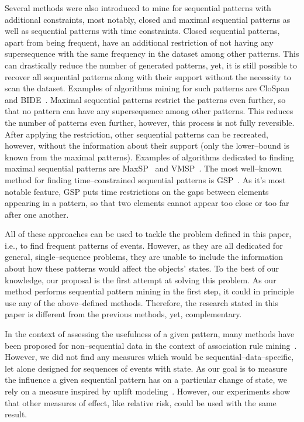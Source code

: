 \documentclass[runningheads,a4paper]{llncs}
\begin{document}
Several methods were also introduced to mine for sequential patterns with additional constraints, most notably, closed and maximal sequential patterns as well as sequential patterns with time constraints.
Closed sequential patterns, apart from being frequent, have an additional restriction of not having any supersequence with the same frequency in the dataset among other patterns.
This can drastically reduce the number of generated patterns, yet, it is still possible to recover all sequential patterns along with their support without the necessity to scan the dataset.
Examples of algorithms mining for such patterns are CloSpan~\cite{Yan:2003} and BIDE~\cite{Wang:2004}.
Maximal sequential patterns restrict the patterns even further, so that no pattern can have any supersequence among other patterns.
This reduces the number of patterns even further, however, this process is not fully reversible.
After applying the restriction, other sequential patterns can be recreated, however, without the information about their support (only the lower--bound is known from the maximal patterns).
Examples of algorithms dedicated to finding maximal sequential patterns are MaxSP~\cite{Fournier:2013} and VMSP~\cite{Fournier:2014-2}.
The most well--known method for finding time--constrained sequential patterns is GSP~\cite{Srikant:1996}.
As it's most notable feature, GSP puts time restrictions on the gaps between elements appearing in a pattern, so that two elements cannot appear too close or too far after one another.

All of these approaches can be used to tackle the problem defined in this paper, i.e., to find frequent patterns of events.
However, as they are all dedicated for general, single--sequence problems, they are unable to include the information about how these patterns would affect the objects' states.
To the best of our knowledge, our proposal is the first attempt at solving this problem.
As our method performs sequential pattern mining in the first step, it could in principle use any of the above--defined methods.
Therefore, the research stated in this paper is different from the previous methods, yet, complementary.

In the context of assessing the usefulness of a given pattern, many methods have been proposed for non--sequential data in the context of association rule mining~\cite{Lenca:2007,Tan:2002}.
However, we did not find any measures which would be sequential--data--specific, let alone designed for sequences of events with state.
As our goal is to measure the influence a given sequential pattern has on a particular change of state, we rely on a measure inspired by uplift modeling~\cite{Radcliffe:1999}.
However, our experiments show that other measures of effect, like relative risk, could be used with the same result.
\end{document}
